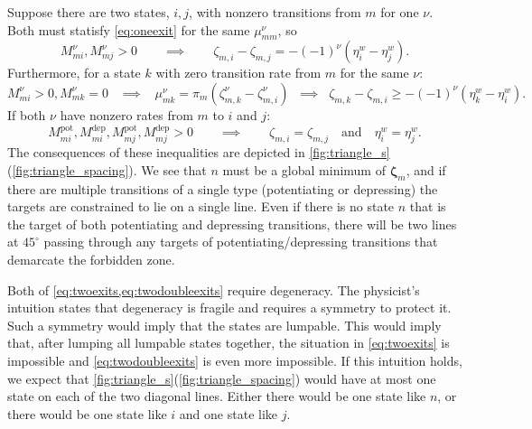 \documentclass[12pt]{article}
\newcommand{\eqm}{\pi}
\newcommand{\etwm}{\eta^w}
\newcommand{\dgnm}{\zeta}
\newcommand{\dgn}{\boldsymbol{\dgnm}}
\newcommand{\MMdm}{M}
\newcommand{\pot}{^{\text{pot}}}
\newcommand{\dep}{^{\text{dep}}}
\begin{document}
Suppose there are two states, \(i,j\), with nonzero transitions from \(m\) for one \(\nu\).
Both must statisfy \cref{eq:oneexit} for the same \(\mu^\nu_{mm}\), so
%
\begin{equation}\label{eq:twoexits}
  \MMdm^\nu_{mi}, \MMdm^\nu_{mj} > 0
  \qquad \implies \qquad
  \dgnm_{m,i} - \dgnm_{m,j} = - (-1)^\nu (\etwm_i - \etwm_j).
\end{equation}
%
Furthermore, for a state \(k\) with zero transition rate from \(m\) for the same \(\nu\):
%
\begin{equation}\label{eq:nonexit}
  \MMdm^\nu_{mi} > 0, \MMdm^\nu_{mk} = 0 
  \;\;\; \implies \;\;\;
  \mu^\nu_{mk} = \eqm_m (\dgnm^\nu_{m,k} - \dgnm^\nu_{m,i})
  \;\; \implies \;\;
  \dgnm_{m,k} - \dgnm_{m,i} \geq - (-1)^\nu (\etwm_k - \etwm_i).
\end{equation}
%
If both \(\nu\) have nonzero rates from \(m\) to \(i\) and \(j\):
%
\begin{equation}\label{eq:twodoubleexits}
  \MMdm\pot_{mi}, \MMdm\dep_{mi}, \MMdm\pot_{mj}, \MMdm\dep_{mj} > 0
  \qquad \implies \qquad
  \dgnm_{m,i} = \dgnm_{m,j} 
  \quad \text{and} \quad
  \etwm_i = \etwm_j.
\end{equation}
%
The consequences of these inequalities are depicted in \cref{fig:triangle_s}(\ref{fig:triangle_spacing}).
We see that \(n\) must be a global minimum of \(\dgn_m\), and if there are multiple transitions of a single type (potentiating or depressing) the targets are constrained to lie on a single line.
Even if there is no state \(n\) that is the target of both potentiating and depressing transitions, there will be two lines at \(45^\circ \) passing through any targets of potentiating/depressing transitions that demarcate the forbidden zone.

Both of \cref{eq:twoexits,eq:twodoubleexits} require degeneracy.
The physicist's intuition states that degeneracy is fragile and requires a symmetry to protect it.
Such a symmetry would imply that the states are lumpable.
This would imply that, after lumping all lumpable states together, the situation in \cref{eq:twoexits} is impossible and \cref{eq:twodoubleexits} is even more impossible.
If this intuition holds, we expect that \cref{fig:triangle_s}(\ref{fig:triangle_spacing}) would have at most one state on each of the two diagonal lines.
Either there would be one state like \(n\), or there would be one state like \(i\) and one state like \(j\). 

\end{document}
